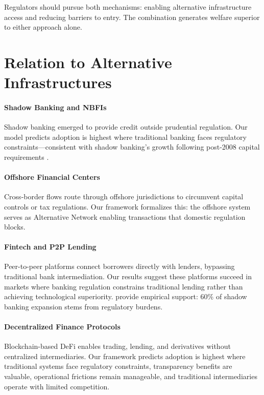 Regulators should pursue both mechanisms: enabling alternative infrastructure access and reducing barriers to entry. The combination generates welfare superior to either approach alone.

\section{Relation to Alternative Infrastructures}

\paragraph{Shadow Banking and NBFIs}
Shadow banking emerged to provide credit outside prudential regulation. Our model predicts adoption is highest where traditional banking faces regulatory constraints—consistent with shadow banking's growth following post-2008 capital requirements \cite{buchak_fintech_2018}.

\paragraph{Offshore Financial Centers}
Cross-border flows route through offshore jurisdictions to circumvent capital controls or tax regulations. Our framework formalizes this: the offshore system serves as Alternative Network enabling transactions that domestic regulation blocks.

\paragraph{Fintech and P2P Lending}
Peer-to-peer platforms connect borrowers directly with lenders, bypassing traditional bank intermediation. Our results suggest these platforms succeed in markets where banking regulation constrains traditional lending rather than achieving technological superiority.  provide empirical support: 60\% of shadow banking expansion stems from regulatory burdens.

\paragraph{Decentralized Finance Protocols}
Blockchain-based DeFi enables trading, lending, and derivatives without centralized intermediaries. Our framework predicts adoption is highest where traditional systems face regulatory constraints, transparency benefits are valuable, operational frictions remain manageable, and traditional intermediaries operate with limited competition.

